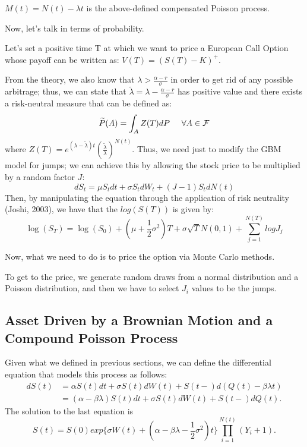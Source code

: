\documentclass[paper=a4, fontsize=12pt]{scrartcl} %
\numberwithin{equation}{section}
\begin{document}
$M(t) = N(t) - \lambda t$ is the above-defined compensated Poisson process.		\par
Now, let's talk in terms of probability. \par
Let's set a positive time T at which we want to price a European Call Option whose payoff can be written as: $V(T) = (S(T) - K)^+$. 	\par
From the theory, we also know that $\lambda > \frac{\alpha - r}{\sigma}$ in order to get rid of any possible arbitrage; thus, we can state that $\widetilde{\lambda} = \lambda - \frac{\alpha - r}{\sigma}$ has positive value and there exists a risk-neutral measure that can be defined as: 
	\begin{equation}
		\widetilde{P}(A) = \int_A Z(T) dP \hspace{0.5 cm} {\forall A \in \mathcal{F}}
	\end{equation}
where $Z(T) = e^{(\lambda - \widetilde{\lambda})t} (\frac{\widetilde{\lambda}}{\lambda})^{N(t)}$.
Thus, we need just to modify the GBM model for jumps; we can achieve this by allowing the stock price to be multiplied by a random factor $J$:
	\begin{equation}
		d S_t = \mu S_t dt + \sigma S_t dW_t + (J-1) S_t dN(t)
	\end{equation}
Then, by manipulating the equation through the application of risk neutrality (Joshi, 2003), we have that the $log(S(T))$ is given by:
	\begin{equation}
		\log(S_T) = \log(S_0) + \left( \mu + \frac{1}{2} \sigma^2 \right)T + \sigma \sqrt{T} N(0,1) + \sum_{j=1}^{N(T)} log J_j
	\end{equation}

Now, what we need to do is to price the option via Monte Carlo methods. \par
To get to the price, we generate random draws from a normal distribution and a Poisson distribution, and then we have to select $J_i$ values to be the jumps.

\subsection{Asset Driven by a Brownian Motion and a Compound Poisson Process}
Given what we defined in previous sections, we can define the differential equation that models this process as follows:
		\begin{equation}
		\begin{aligned}
			dS(t) &= \alpha S(t) dt + \sigma S(t) dW(t) + S(t-) d(Q(t) - \beta \lambda t) \\
			         &= (\alpha - \beta \lambda)S(t) dt + \sigma S(t) dW(t) + S(t-)dQ(t).
		\end{aligned}
		\end{equation}
The solution to the last equation is
		\begin{equation}
			S(t) = S(0) exp \{\sigma W(t) + (\alpha - \beta \lambda - \frac{1}{2} \sigma^2)t \} \prod_{i=1}^{N(t)} (Y_i + 1).
		\end{equation}
\end{document}
